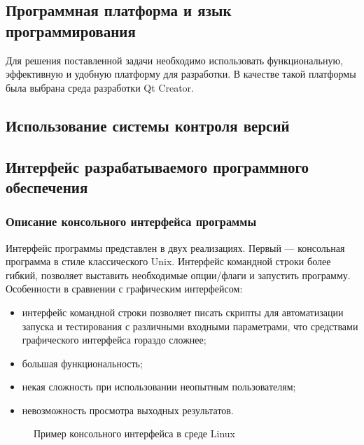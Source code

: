 \subsection {Программная платформа и язык программирования}
Для решения поставленной задачи необходимо использовать функциональную, эффективную и удобную платформу для разработки. В качестве такой платформы была выбрана среда разработки Qt Creator.

\subsection {Использование системы контроля версий}

\subsection {Интерфейс разрабатываемого программного обеспечения}
\subsubsection{Описание консольного интерфейса программы}%
Интерфейс программы представлен в двух реализациях.
Первый — консольная программа в стиле классического Unix. Интерфейс командной строки более гибкий, позволяет выставить необходимые опции/флаги и запустить программу. Особенности в сравнении с графическим интерфейсом:
\begin{itemize}
\item интерфейс командной строки позволяет писать скрипты для автоматизации запуска и тестирования с различными входными параметрами, что средствами графического интерфейса гораздо сложнее;
\item большая функциональность;
\item некая сложность при использовании неопытным пользователям;
\item невозможность просмотра выходных результатов.
\end{itemize}

\begin{figure}[ht]
\caption{Пример консольного интерфейса в среде Linux}
\label{pic:con_scr}
\end{figure}

